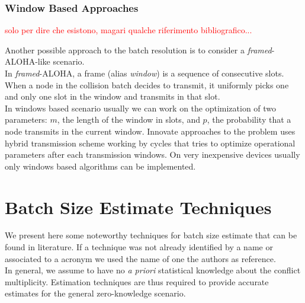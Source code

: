 \documentclass[12pt,a4paper]{report}
\begin{document}
\subsection{Window Based Approaches}
\textcolor{red}{solo per dire che esistono, magari qualche riferimento bibliografico...\\}

Another possible approach to the batch resolution is to consider a \emph{framed}-ALOHA-like scenario.\\
In \emph{framed}-ALOHA, a frame (alias \emph{window}) is a sequence of consecutive slots.  When a node in the collision batch decides to transmit, it uniformly picks one and only one slot in the window and transmits in that slot.\\
In windows based scenario usually we can work on the optimization of two parameters: $m$, the length of the window in slots, and $p$, the probability that a node transmits in the current window.
Innovate approaches to the problem uses hybrid transmission scheme working by cycles that tries to optimize operational parameters after each transmission windows. On very inexpensive devices usually only windows based algorithms can be implemented.


\chapter{Batch Size Estimate Techniques}
\label{ch:Batch Size Estimate Techniques}
We present here some noteworthy techniques for batch size estimate that can be found in literature.
If a technique was not already identified by a name or associated to a acronym we used the name of one the authors as reference.\\

In general, we assume to have no \emph{a priori} statistical knowledge about the conflict multiplicity. Estimation techniques are thus required to provide accurate estimates for the general zero-knowledge scenario.\\
\end{document}
